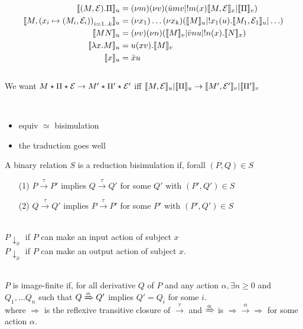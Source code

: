 \documentclass[a4paper,12pt]{book}
\begin{document}
\begin{align*}
\llbracket (M,\mathcal{E}).\Pi \rrbracket_u &= (\nu m)(\nu v)(\bar{u}mv|!m(x)\llbracket M,\mathcal{E}\rrbracket_x|\llbracket\Pi\rrbracket_v)\\
\llbracket M,\left( x_i\mapsto(M_i,\mathcal{E}_i)\right)_{i=1..k}\rrbracket_u &= (\nu x_1)\ldots(\nu x_k)(\llbracket M\rrbracket_u|!x_1(u).\llbracket M_1,\mathcal{E}_1\rrbracket_u | \ldots)\\
\llbracket MN \rrbracket_u &= (\nu v) (\nu n) (\llbracket M \rrbracket_v | \bar{v}nu|!n(x).\llbracket N\rrbracket_x)\\
\llbracket\lambda x.M\rrbracket_u &= u (xv).\llbracket M\rrbracket_v\\
\llbracket x\rrbracket_u &= \bar{x}u
\end{align*}
~\\
We want $M\star\Pi\star\mathcal{E}\rightarrow M'\star\Pi'\star\mathcal{E}'$ iff $\llbracket M,\mathcal{E}\rrbracket_u|\llbracket\Pi\rrbracket_u\rightarrow\llbracket M',\mathcal{E}'\rrbracket_v|\llbracket\Pi'\rrbracket_v$

~\\

\begin{itemize}
	\item equiv $\simeq$ bisimulation
	\item the traduction goes well
\end{itemize}
\newpage

\begin{definition}
A binary relation $S$ is a reduction bisimulation if, forall $(P,Q)\in S$\\
\begin{itemize}
	\item[(1)] $P\xrightarrow{\tau}P'$ implies $Q\xrightarrow{\tau}Q'$ for some $Q'$ with $(P',Q')\in S$
	\item[(2)] $Q\xrightarrow{\tau}Q'$ implies $P\xrightarrow{\tau}P'$ for some $P'$ with $(P',Q')\in S$
\end{itemize}
\end{definition}


\begin{definition}[Observability:]\\
$P\downarrow_{x}$ if $P$ can make an input action of subject $x$\\
$P\downarrow_{\bar{x}}$ if $P$ can make an output action of subject $x$.
\end{definition}


\begin{definition}\\
$P$ is image-finite if, for all derivative $Q$ of $P$ and any action $\alpha, \exists n\geq0$ and $Q_1,\ldots Q_n$ such that $Q\xRightarrow{\alpha}Q'$ implies $Q'=Q_i$ for some $i$.\\
where $\Rightarrow$ is the reflexive transitive closure of $\xrightarrow{\tau}$ and $\xRightarrow{\alpha}$ is $\Rightarrow\xrightarrow{\alpha}\Rightarrow$ for some action $\alpha$.
\end{definition}
\end{document}

